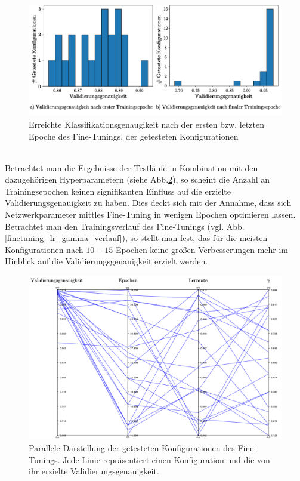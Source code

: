 \begin{figure}[h]
\includegraphics[scale=0.750]{NNOPT/init_and_end_perf_finetuning.pdf}
\caption{Erreichte Klassifikationsgenaugikeit nach der ersten bzw. letzten Epoche des Fine-Tunings, der getesteten Konfigurationen}
\label{finetuning_int_end}
\end{figure}
\\
Betrachtet man die Ergebnisse der Testläufe in Kombination mit den dazugehörigen Hyperparametern (siehe Abb.\ref{finetuning_all}), so scheint die Anzahl an Trainingsepochen keinen signifikanten Einfluss auf die erzielte Validierungsgenauigkeit zu haben. Dies deckt sich mit der Annahme, dass sich Netzwerkparameter mittles Fine-Tuning in wenigen Epochen optimieren lassen. Betrachtet man den Trainingsverlauf des Fine-Tunings (vgl. Abb. \ref{finetuning_lr_gamma_verlauf}), so stellt man fest, das für die meisten Konfigurationen nach $10-15$ Epochen keine großen Verbesserungen mehr im Hinblick auf die Validierungsgenauigkeit erzielt werden.  
\begin{figure}[h]
\includegraphics[scale=0.58]{NNOPT/finetuning_all.pdf}
\caption{Parallele Darstellung der getesteten Konfigurationen des Fine-Tunings. Jede Linie repräsentiert einen Konfiguration und die von ihr erzielte Validierungsgenauigkeit.}
\label{finetuning_all}
\end{figure}
